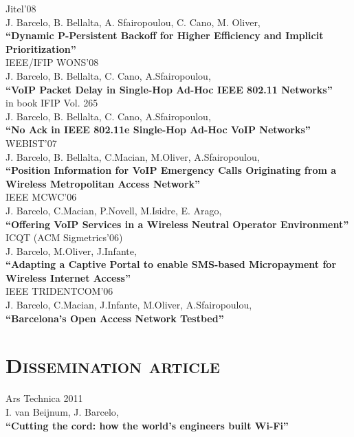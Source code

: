 \documentclass[line,margin]{res}
\begin{document}
\begin{resume}
\hfill {Jitel'08} \\
J. Barcelo, B. Bellalta, A. Sfairopoulou, C. Cano, M. Oliver,\\
\textbf{``Dynamic P-Persistent Backoff for Higher Efficiency and Implicit Prioritization''}\\

\hfill {IEEE/IFIP WONS'08} \\
J. Barcelo, B. Bellalta,  C. Cano, A.Sfairopoulou,\\
\textbf{``VoIP Packet Delay in Single-Hop Ad-Hoc IEEE 802.11 Networks''}\\

\hfill {in book IFIP Vol. 265} \\
J. Barcelo, B. Bellalta,  C. Cano, A.Sfairopoulou,\\
\textbf{``No Ack in IEEE 802.11e Single-Hop Ad-Hoc VoIP Networks''}\\

\hfill {WEBIST'07} \\
J. Barcelo, B. Bellalta, C.Macian, M.Oliver, A.Sfairopoulou,\\
\textbf{``Position Information for VoIP Emergency Calls Originating from a Wireless Metropolitan Access Network''}\\

\hfill {IEEE MCWC'06} \\
J. Barcelo, C.Macian, P.Novell, M.Isidre, E. Arago,\\
\textbf{``Offering VoIP Services in a Wireless Neutral Operator Environment''}\\

\hfill {ICQT (ACM Sigmetrics'06)} \\
J. Barcelo, M.Oliver, J.Infante,\\
\textbf{``Adapting a Captive Portal to enable SMS-based Micropayment for Wireless Internet Access''}\\

\hfill {IEEE TRIDENTCOM'06} \\
J. Barcelo, C.Macian, J.Infante, M.Oliver, A.Sfairopoulou,\\
\textbf{``Barcelona's Open Access Network Testbed''}\\

\section{\textsc{Dissemination article}}
\hfill {Ars Technica 2011} \\
I. van Beijnum, J. Barcelo, \\
\textbf{``Cutting the cord: how the world's engineers built Wi-Fi''}\\


\end{resume}
\end{document}
